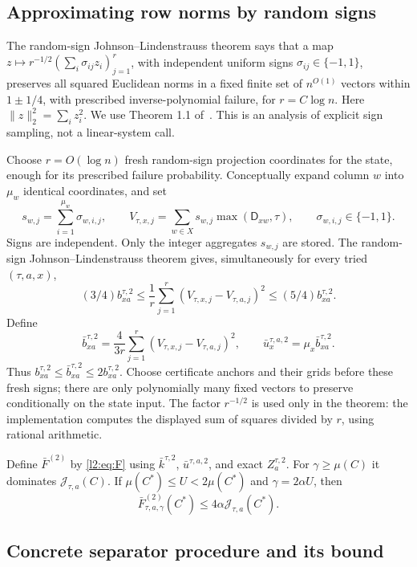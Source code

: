 \documentclass[11pt]{article}
\theoremstyle{definition}
\begin{document}
\subsection{Approximating row norms by random signs}

The random-sign Johnson--Lindenstrauss theorem says that a map
$z\mapsto r^{-1/2}(\sum_i\sigma_{ij}z_i)_{j=1}^r$, with independent
uniform signs $\sigma_{ij}\in\{-1,1\}$, preserves all squared Euclidean
norms in a fixed finite set of $n^{O(1)}$ vectors within $1\pm1/4$,
with prescribed inverse-polynomial failure, for $r=C\log n$.
Here $\|z\|_2^2=\sum_i z_i^2$. We use Theorem 1.1 of~\cite{Ach03}.
This is an analysis of explicit sign sampling, not a linear-system call.

Choose $r=O(\log n)$ fresh random-sign projection coordinates for the
state, enough for its prescribed failure probability. Conceptually
expand column $w$ into $\mu_w$ identical coordinates, and set
\[
 s_{w,j}=\sum_{i=1}^{\mu_w}\sigma_{w,i,j},
 \qquad
 V_{\tau,x,j}=\sum_{w\in X}s_{w,j}\max(\mathsf D_{xw},\tau),
 \qquad \sigma_{w,i,j}\in\{-1,1\}.
\]
Signs are independent. Only the integer aggregates $s_{w,j}$ are
stored. The random-sign Johnson--Lindenstrauss theorem \cite[Theorem 1.1]{Ach03} gives,
simultaneously for every tried $(\tau,a,x)$,
\[
 (3/4)b^{\tau,2}_{xa}\le
 \frac1r\sum_{j=1}^r(V_{\tau,x,j}-V_{\tau,a,j})^2
 \le(5/4)b^{\tau,2}_{xa}.
\]
Define
\[
 \bar b^{\tau,2}_{xa}=\frac{4}{3r}\sum_{j=1}^r
       (V_{\tau,x,j}-V_{\tau,a,j})^2,\qquad
 \bar u^{\tau,a,2}_x=\mu_x\bar b^{\tau,2}_{xa}.
\]
Thus $b^{\tau,2}_{xa}\le\bar b^{\tau,2}_{xa}\le2b^{\tau,2}_{xa}$.
Choose certificate anchors and their
grids before these fresh signs; there are only polynomially many fixed
vectors to preserve conditionally on the state input. The factor $r^{-1/2}$ is used only in the theorem: the implementation computes the displayed sum of squares divided by $r$, using rational arithmetic.

Define $\bar F^{(2)}$ by \eqref{l2:eq:F} using $\bar k^{\tau,2}$, $\bar u^{\tau,a,2}$, and exact $Z^{\tau,2}_a$.
For $\gamma\ge\mu(C)$ it dominates $\mathcal J_{\tau,a}(C)$. If
$\mu(C^*)\le U<2\mu(C^*)$ and $\gamma=2\alpha U$, then
\begin{equation}\label{l2:eq:surrogate-factor}
 \bar F^{(2)}_{\tau,a,\gamma}(C^*)\le4\alpha\mathcal J_{\tau,a}(C^*).
\end{equation}

\subsection{Concrete separator procedure and its bound}
\end{document}

